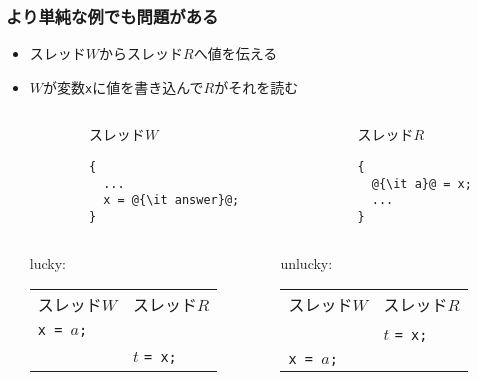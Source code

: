 \documentclass[12pt,dvipdfmx]{beamer}
\begin{document}
\begin{frame}[fragile]
  \frametitle{より単純な例でも問題がある}
  \begin{itemize}
  \item スレッド$W$からスレッド$R$へ値を伝える
  \item $W$が変数{\tt x}に値を書き込んで$R$がそれを読む
    \begin{columns}
      \begin{column}{0.1\textwidth}
      \end{column}
      \begin{column}{0.4\textwidth}
スレッド$W$        
\begin{lstlisting}
{
  ...
  x = @{\it answer}@;
}
\end{lstlisting}
      \end{column}
      \begin{column}{0.1\textwidth}
      \end{column}
      \begin{column}{0.4\textwidth}
スレッド$R$
\begin{lstlisting}
{  
  @{\it a}@ = x;
  ...
}
\end{lstlisting}
      \end{column}
    \end{columns}

    \begin{columns}
      \begin{column}{0.5\textwidth}
lucky:
        
\begin{tabular}{l|l}
スレッド$W$          & スレッド$R$    \\
{\tt x = }$a${\tt ;} &                \\
                     & $t$ {\tt = x;} \\
\end{tabular}
      \end{column}
      \begin{column}{0.5\textwidth}
unlucky:
        
\begin{tabular}{l|l}
スレッド$W$          & スレッド$R$    \\
                     & $t$ {\tt = x;} \\
{\tt x = }$a${\tt ;} &                \\
\end{tabular}
      \end{column}
    \end{columns}
\end{itemize}
\end{frame}
\end{document}
